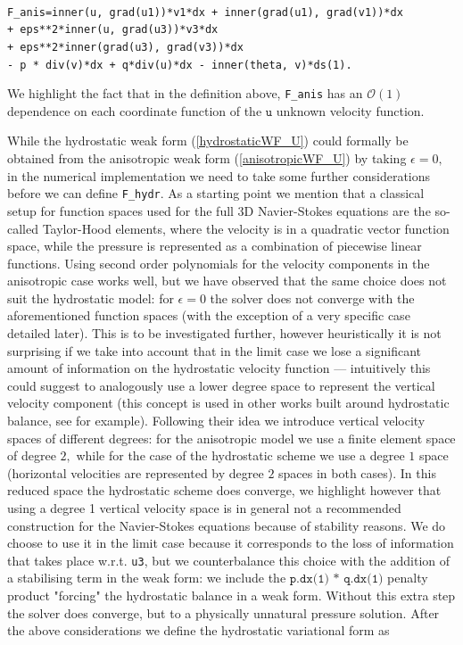 \documentclass[12pt]{report}
\numberwithin{theorem}{chapter}
\numberwithin{corollary}{chapter}
\numberwithin{lemma}{chapter}
\numberwithin{remark}{chapter}
\numberwithin{definition}{chapter}
\numberwithin{prop}{chapter}
\begin{document}
\texttt{
\\
F\_anis=inner(u, grad(u1))*v1*dx + inner(grad(u1), grad(v1))*dx \\
+ eps**2*inner(u, grad(u3))*v3*dx \\
+ eps**2*inner(grad(u3), grad(v3))*dx \\
 - p * div(v)*dx + q*div(u)*dx - inner(theta, v)*ds(1). \\
}

We highlight the fact that in the definition above, \texttt{F\_anis} has an $\mathcal{O}(1)$ dependence on each coordinate function of the $\texttt{u}$ unknown velocity function.

While the hydrostatic weak form (\ref{hydrostaticWF_U}) could formally be obtained from the anisotropic weak form (\ref{anisotropicWF_U}) by taking $\epsilon = 0,$ in the numerical implementation we need to take some further considerations before we can define \texttt{F\_hydr}.
As a starting point we mention that a classical setup for function spaces used for the full 3D Navier-Stokes equations are the so-called Taylor-Hood elements, where the velocity is in a quadratic vector function space, while the pressure is represented as a combination of piecewise linear functions. Using second order polynomials for the velocity components in the anisotropic case works well, but we have observed that the same choice does not suit the hydrostatic model: for $\epsilon = 0$ the solver does not converge with the aforementioned function spaces (with the exception of a very specific case detailed later). This is to be investigated further, however heuristically it is not surprising if we take into account that in the limit case we lose a significant amount of information on the hydrostatic velocity function --- intuitively this could suggest to analogously use a lower degree space to represent the vertical velocity component (this concept is used in other works built around hydrostatic balance, see \cite{danilov2002finite} for example). Following their idea we introduce vertical velocity spaces of different degrees: for the anisotropic model we use a finite element space of degree $2,$ while for the case of the hydrostatic scheme we use a degree $1$ space (horizontal velocities are represented by degree $2$ spaces in both cases). In this reduced space the hydrostatic scheme does converge, we highlight however that using a degree 1 vertical velocity space is in general not a recommended construction for the Navier-Stokes equations because of stability reasons. We do choose to use it in the limit case because it corresponds to the loss of information that takes place w.r.t. \texttt{u3}, but we counterbalance this choice with the addition of a stabilising term in the weak form: we include the $\texttt{p.dx(1) * q.dx(1)}$ penalty product "forcing" the hydrostatic balance in a weak form. Without this extra step the solver does converge, but to a physically unnatural pressure solution. After the above considerations we define the hydrostatic variational form as
\end{document}
